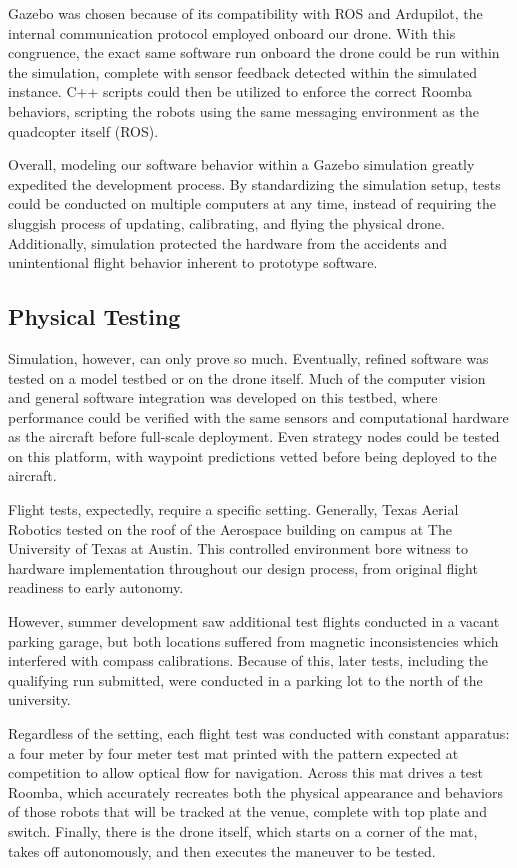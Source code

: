 \documentclass[12pt,letterpaper]{article}
\begin{document}
		Gazebo was chosen because of its compatibility with ROS and Ardupilot, the internal communication protocol employed onboard our drone. With this congruence, the exact same software run onboard the drone could be run within the simulation, complete with sensor feedback detected within the simulated instance. C++ scripts could then be utilized to enforce the correct Roomba behaviors, scripting the robots using the same messaging environment as the quadcopter itself (ROS).

		Overall, modeling our software behavior within a Gazebo simulation greatly expedited the development process. By standardizing the simulation setup, tests could be conducted on multiple computers at any time, instead of requiring the sluggish process of updating, calibrating, and flying the physical drone. Additionally, simulation protected the hardware from the accidents and unintentional flight behavior inherent to prototype software.


	\subsection*{Physical Testing}
		Simulation, however, can only prove so much. Eventually, refined software was tested on a model testbed or on the drone itself. Much of the computer vision and general software integration was developed on this testbed, where performance could be verified with the same sensors and computational hardware as the aircraft before full-scale deployment. Even strategy nodes could be tested on this platform, with waypoint predictions vetted before being deployed to the aircraft.

		Flight tests, expectedly, require a specific setting. Generally, Texas Aerial Robotics tested on the roof of the Aerospace building on campus at The University of Texas at Austin. This controlled environment bore witness to hardware implementation throughout our design process, from original flight readiness to early autonomy.

		However, summer development saw additional test flights conducted in a vacant parking garage, but both locations suffered from magnetic inconsistencies which interfered with compass calibrations. Because of this, later tests, including the qualifying run submitted, were conducted in a parking lot to the north of the university.

		Regardless of the setting, each flight test was conducted with constant apparatus: a four meter by four meter test mat printed with the pattern expected at competition to allow optical flow for navigation. Across this mat drives a test Roomba, which accurately recreates both the physical appearance and behaviors of those robots that will be tracked at the venue, complete with top plate and switch. Finally, there is the drone itself, which starts on a corner of the mat, takes off autonomously, and then executes the maneuver to be tested.
\end{document}
